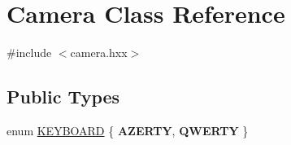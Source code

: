 \hypertarget{class_camera}{}\section{Camera Class Reference}
\label{class_camera}


{\ttfamily \#include $<$camera.\+hxx$>$}

\subsection*{Public Types}
\begin{DoxyCompactItemize}
\item 
enum \hyperlink{class_camera_a3ba12bb77fc0e6ce7048a7c03c7fa776}{K\+E\+Y\+B\+O\+A\+RD} \{ {\bfseries A\+Z\+E\+R\+TY}, 
{\bfseries Q\+W\+E\+R\+TY}
 \}
\end{DoxyCompactItemize}
